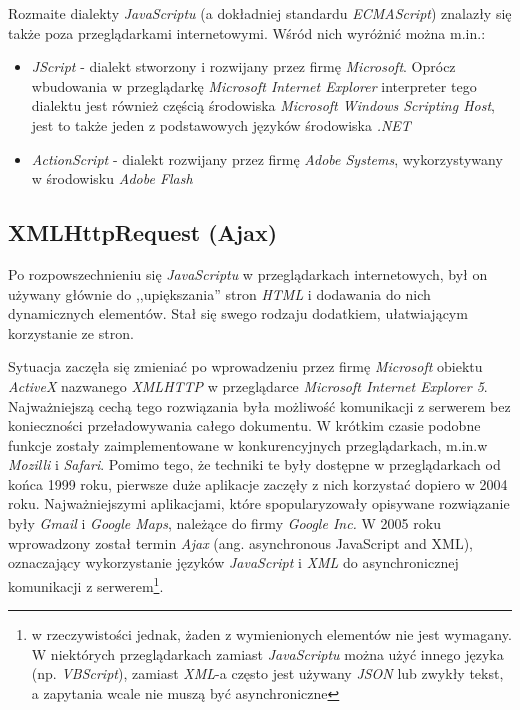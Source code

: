 \documentclass[11pt,twoside]{report}
\begin{document}
Rozmaite dialekty \emph{JavaScriptu} (a dokładniej standardu
\emph{ECMAScript}) znalazły się także poza przeglądarkami
internetowymi. Wśród nich wyróżnić można m.in.:

\begin{itemize}
\item \emph{JScript} - dialekt stworzony i rozwijany przez firmę
  \emph{Microsoft}. Oprócz wbudowania w przeglądarkę \emph{Microsoft
    Internet Explorer} interpreter tego dialektu jest również częścią
  środowiska \emph{Microsoft Windows Scripting Host}, jest to także
  jeden z podstawowych języków środowiska \emph{.NET}
\item \emph{ActionScript} - dialekt rozwijany przez firmę \emph{Adobe
    Systems}, wykorzystywany w środowisku \emph{Adobe Flash}
\end{itemize}

\subsection{XMLHttpRequest (Ajax)}
Po rozpowszechnieniu się \emph{JavaScriptu} w przeglądarkach
internetowych, był on używany głównie do ,,upiększania'' stron
\emph{HTML} i dodawania do nich dynamicznych elementów. Stał się swego
rodzaju dodatkiem, ułatwiającym korzystanie ze stron.

Sytuacja zaczęła się zmieniać po wprowadzeniu przez firmę
\emph{Microsoft} obiektu \emph{ActiveX} nazwanego \emph{XMLHTTP} w
przeglądarce \emph{Microsoft Internet Explorer 5}. Najważniejszą cechą
tego rozwiązania była możliwość komunikacji z serwerem bez
konieczności przeładowywania całego dokumentu. W krótkim czasie
podobne funkcje zostały zaimplementowane w konkurencyjnych
przeglądarkach, m.in.w \emph{Mozilli} i \emph{Safari}. Pomimo tego, że
techniki te były dostępne w przeglądarkach od końca 1999 roku,
pierwsze duże aplikacje zaczęły z nich korzystać dopiero w 2004
roku. Najważniejszymi aplikacjami, które spopularyzowały opisywane
rozwiązanie były \emph{Gmail} i \emph{Google Maps}, należące do firmy
\emph{Google Inc.} W 2005 roku wprowadzony został termin \emph{Ajax}
(ang. asynchronous JavaScript and XML), oznaczający wykorzystanie
języków \emph{JavaScript} i \emph{XML} do asynchronicznej komunikacji
z serwerem\footnote{w rzeczywistości jednak, żaden z wymienionych
  elementów nie jest wymagany. W niektórych przeglądarkach zamiast
  \emph{JavaScriptu} można użyć innego języka (np. \emph{VBScript}),
  zamiast \emph{XML}-a często jest używany \emph{JSON} lub zwykły
  tekst, a zapytania wcale nie muszą być asynchroniczne}.
\end{document}
